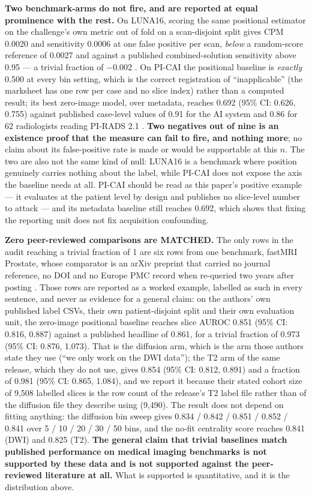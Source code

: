 \documentclass[11pt,a4paper]{article}
\begin{document}
\textbf{Two benchmark-arms do not fire, and are reported at equal prominence
with the rest.} On LUNA16, scoring the same positional estimator on the
challenge's own metric out of fold on a scan-disjoint split gives CPM 0.0020 and
sensitivity 0.0006 at one false positive per scan, \emph{below} a random-score
reference of 0.0027 and against a published combined-solution sensitivity above
0.95 --- a trivial fraction of $-0.002$ \citep{setio2017luna16}. On PI-CAI the
positional baseline is \emph{exactly} 0.500 at every bin setting, which is the
correct registration of ``inapplicable'' (the marksheet has one row per case and
no slice index) rather than a computed result; its best zero-image model, over
metadata, reaches 0.692 (95\% CI: 0.626, 0.755) against published case-level
values of 0.91 for the AI system and 0.86 for 62 radiologists reading PI-RADS 2.1
\citep{saha2024picai}. \textbf{Two negatives out of nine is an existence proof that
the measure can fail to fire, and nothing more}; no claim about its
false-positive rate is made or would be supportable at this $n$. The two are also
not the same kind of null: LUNA16 is a benchmark where position genuinely carries
nothing about the label, while PI-CAI does not expose the axis the baseline needs
at all. PI-CAI should be read as this paper's positive example --- it evaluates at
the patient level by design and publishes no slice-level number to attack --- and
its metadata baseline still reaches 0.692, which shows that fixing the reporting
unit does not fix acquisition confounding.

\textbf{Zero peer-reviewed comparisons are MATCHED.} The only rows in the audit
reaching a trivial fraction of 1 are six rows from one benchmark, fastMRI
Prostate, whose comparator is an arXiv preprint that carried no journal
reference, no DOI and no Europe PMC record when re-queried two years after
posting \citep{rempe2024kspace}. Those rows are reported as a worked example, labelled
as such in every sentence, and never as evidence for a general claim: on the
authors' own published label CSVs, their own patient-disjoint split and their own
evaluation unit, the zero-image positional baseline reaches slice AUROC 0.851
(95\% CI: 0.816, 0.887) against a published headline of 0.861, for a trivial
fraction of 0.973 (95\% CI: 0.876, 1.073). That is the diffusion arm, which is
the arm those authors state they use (``we only work on the DWI data''); the
T2 arm of the same release, which they do not use, gives 0.854 (95\% CI: 0.812,
0.891) and a fraction of 0.981 (95\% CI: 0.865, 1.084), and we report it because
their stated cohort size of 9{,}508 labelled slices is the row count of the
release's T2 label file rather than of the diffusion file they describe using
(9{,}490). The result does not depend on fitting anything: the diffusion bin
sweep gives 0.834 / 0.842 / 0.851 / 0.852 / 0.841 over 5 / 10 / 20 / 30 / 50
bins, and the no-fit centrality score reaches 0.841 (DWI) and 0.825 (T2). \textbf{The general claim that trivial baselines match published
performance on medical imaging benchmarks is not supported by these data and is
not supported against the peer-reviewed literature at all.} What is supported is
quantitative, and it is the distribution above.
\end{document}

